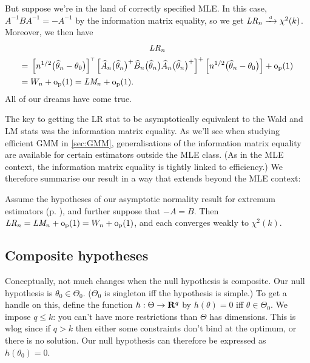 \documentclass[11pt,letterpaper,reqno,oneside]{article}
\begin{document}
But suppose we're in the land of correctly specified MLE. In this case, $A^{-1} B A^{-1} = -A^{-1}$ by the information matrix equality, so we get $\mathit{LR}_n \xrightarrow{{\scriptscriptstyle \mathrm{\;d\;}}} \chi^2(k)$. Moreover, we then have
%
\begin{multline*}
	\mathit{LR}_n
	\\
	\begin{aligned}
		={}& \left[ n^{1/2} \bigl( \widehat{\theta}_n - \theta_0 \bigr) \right]^{\scriptscriptstyle \top}
		\left[ \widehat{A}_n\bigl( \widehat{\theta}_n \bigr)^+
		\widehat{B}_n\bigl( \widehat{\theta}_n \bigr)
		\widehat{A}_n\bigl( \widehat{\theta}_n \bigr)^+
		\right]^+
		\left[ n^{1/2} \bigl( \widehat{\theta}_n - \theta_0 \bigr) \right]
		+ \mathrm{o}_{\mathrm{p}}(1)
		\\
		={}& W_n + \mathrm{o}_{\mathrm{p}}(1)
		= \textit{LM}_n + \mathrm{o}_{\mathrm{p}}(1) .
	\end{aligned}
\end{multline*}
%
All of our dreams have come true.


The key to getting the LR stat to be asymptotically equivalent to the Wald and LM stats was the information matrix equality. As we'll see when studying efficient GMM in \cref{sec:GMM}, generalisations of the information matrix equality are available for certain estimators outside the MLE class. (As in the MLE context, the information matrix equality is tightly linked to efficiency.) We therefore summarise our result in a way that extends beyond the MLE context:
%
\begin{proposition}
	Assume the hypotheses of our asymptotic normality result for extremum estimators (p. \pageref{proposition:asymptotic_normality}), and further suppose that $-A=B$. Then $\mathit{LR}_n = \textit{LM}_n + \mathrm{o}_{\mathrm{p}}(1) = W_n + \mathrm{o}_{\mathrm{p}}(1)$, and each converges weakly to $\chi^2(k)$.
\end{proposition}



\subsection{Composite hypotheses}
\label{sec:hypothesis_testing:composite}

Conceptually, not much changes when the null hypothesis is composite. Our null hypothesis is $\theta_0 \in \Theta_0$. ($\Theta_0$ is singleton iff the hypothesis is simple.) To get a handle on this, define the function $h : \Theta \to \mathbf{R}^q$ by $h(\theta)=0$ iff $\theta \in \Theta_0$. We impose $q \leq k$: you can't have more restrictions than $\Theta$ has dimensions. This is wlog since if $q>k$ then either some constraints don't bind at the optimum, or there is no solution. Our null hypothesis can therefore be expressed as $h(\theta_0)=0$.
\end{document}
